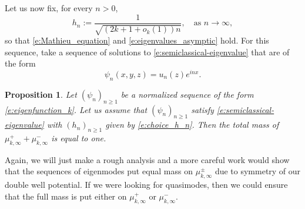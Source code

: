 \documentclass[10pt]{amsart}
\theoremstyle{plain}
\newtheorem{prop}[theo]{Proposition}
\theoremstyle{definition}
\theoremstyle{remark}
\begin{document}
Let us now fix, for every $n>0$,
\begin{equation}
\label{e:choice_h_n}
h_n := \frac{1}{\sqrt{(2k+1 + o_k(1)) n }}, \quad \text{as } n \to \infty,
\end{equation}
so that \eqref{e:Mathieu_equation} and \eqref{e:eigenvalues_asymptic} hold. For this sequence, take a sequence of solutions to \eqref{e:semiclassical-eigenvalue} that are of the form
\begin{equation}
\label{e:eigenfunction_k}
\psi_n(x,y,z) = u_{n}(z)e^{inx}.
\end{equation}

\begin{prop}
\label{p:examples_sequences}
Let $(\psi_n)_{n\geq 1}$ be a normalized sequence of the form \eqref{e:eigenfunction_k}. Let us assume that $(\psi_n)_{n\geq 1}$ satisfy \eqref{e:semiclassical-eigenvalue} with $(h_n)_{n\geq 1}$ given by \eqref{e:choice_h_n}. Then the total mass of $\mu^+_{k,\infty} + \mu^-_{k,\infty}$ is equal to one.
\end{prop}

Again, we will just make a rough analysis and a more careful work would show that the sequences of eigenmodes put equal mass on $\mu_{k,\infty}^\pm$ due to symmetry of our double well potential. If we were looking for quasimodes, then we could ensure that the full mass is put either on $\mu_{k,\infty}^+$ or $\mu_{k,\infty}^-$.
\end{document}
